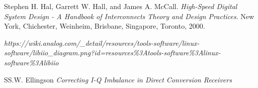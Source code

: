 \documentclass[en,printmode]{mgr}
\begin{document}

\begin{thebibliography}{9}
Stephen H. Hal, Garrett W. Hall, and James A. McCall. 
\textit{High-Speed Digital System Design - A Handbook of Interconnects Theory and Design Practices}.
New York, Chichester, Weinheim, Brisbane, Singapore, Toronto, 2000.

\textit{https://wiki.analog.com/_detail/resources/tools-software/linux-software/libiio_diagram.png?id=resources\%3Atools-software\%3Alinux-software\%3Alibiio}

\bibitem
SS.W. Ellingson
\textit{Correcting I-Q Imbalance in Direct Conversion
Receivers}
\end{thebibliography}
\end{document}
